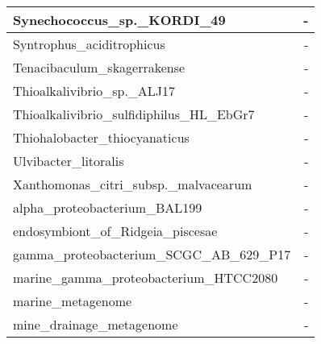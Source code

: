 \documentclass[12pt,a4paper]{article}
\begin{document}
\begin{table}[ht]
\begin{center}
\begin{tabular}{|l*{1}{|r}|}
Synechococcus\_sp.\_KORDI\_49 & - \\ \hline
Syntrophus\_aciditrophicus & - \\ \hline
Tenacibaculum\_skagerrakense & - \\ \hline
Thioalkalivibrio\_sp.\_ALJ17 & - \\ \hline
Thioalkalivibrio\_sulfidiphilus\_HL\_EbGr7 & - \\ \hline
Thiohalobacter\_thiocyanaticus & - \\ \hline
Ulvibacter\_litoralis & - \\ \hline
Xanthomonas\_citri\_subsp.\_malvacearum & - \\ \hline
alpha\_proteobacterium\_BAL199 & - \\ \hline
endosymbiont\_of\_Ridgeia\_piscesae & - \\ \hline
gamma\_proteobacterium\_SCGC\_AB\_629\_P17 & - \\ \hline
marine\_gamma\_proteobacterium\_HTCC2080 & - \\ \hline
marine\_metagenome & - \\ \hline
mine\_drainage\_metagenome & - \\ \hline
\end{tabular}
\end{center}
\end{table}
\end{document}

